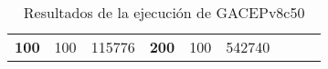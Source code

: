 \begin{table}[H]
\begin{tabular}{|ccrccrccc}
\multicolumn{1}{|c|}{\multirow{-39}{*}{\cellcolor[HTML]{FFFFC7}\textbf{100}}} & \multicolumn{1}{c|}{\multirow{-9}{*}{\cellcolor[HTML]{DDFDFF}100}} & \multicolumn{1}{r|}{\cellcolor[HTML]{DAE8FC}115776}    & \multicolumn{1}{c|}{\multirow{-39}{*}{\cellcolor[HTML]{FFFFC7}\textbf{200}}} & \multicolumn{1}{c|}{\multirow{-10}{*}{\cellcolor[HTML]{DDFDFF}100}} & \multicolumn{1}{r|}{\cellcolor[HTML]{DDFDFF}542740}    &                                                                              &                                                                    &                                                        \\ \cline{1-6}
\end{tabular}
\caption{\label{res:GACEPv8c50}Resultados de la ejecución de GACEPv8c50}
\end{table}

